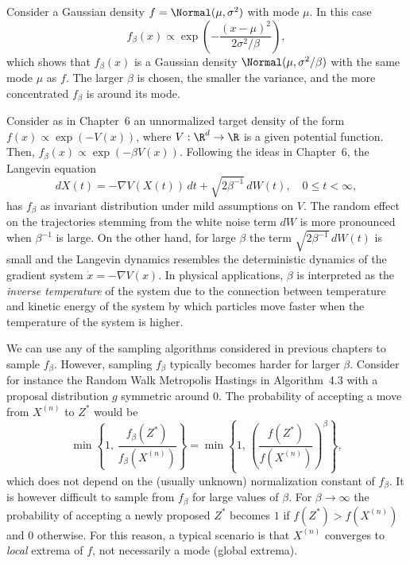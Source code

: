 \begin{example}
\label{ex:7.1}
Consider a Gaussian density $f = \Normal(\mu, \sigma^2)$ with mode $\mu$. In this case
\[
  f_\beta(x) \propto \exp\!\left(-\frac{(x - \mu)^2}{2\sigma^2/\beta}\right),
\]
which shows that $f_\beta(x)$ is a Gaussian density $\Normal(\mu, \sigma^2/\beta)$ with the same
mode $\mu$ as $f$. The larger $\beta$ is chosen, the smaller the variance, and the more
concentrated $f_\beta$ is around its mode.
\end{example}

\begin{example}
\label{ex:7.2}
Consider as in Chapter~6 an unnormalized target density of the form
$f(x) \propto \exp(-V(x))$, where $V : \R^d \to \R$ is a given potential function. Then,
$f_\beta(x) \propto \exp(-\beta V(x))$. Following the ideas in Chapter~6, the Langevin equation
\begin{equation}
  dX(t) = -\nabla V(X(t))\, dt + \sqrt{2\beta^{-1}}\, dW(t), \quad 0 \leq t < \infty,
  \label{eq:7.2}
\end{equation}
has $f_\beta$ as invariant distribution under mild assumptions on $V$. The random effect on
the trajectories stemming from the white noise term $dW$ is more pronounced when $\beta^{-1}$
is large. On the other hand, for large $\beta$ the term $\sqrt{2\beta^{-1}}\, dW(t)$ is small
and the Langevin dynamics resembles the deterministic dynamics of the gradient system
$\dot{x} = -\nabla V(x)$. In physical applications, $\beta$ is interpreted as the
\textit{inverse temperature} of the system due to the connection between temperature and
kinetic energy of the system by which particles move faster when the temperature of the system
is higher.
\end{example}

We can use any of the sampling algorithms considered in previous chapters to sample $f_\beta$.
However, sampling $f_\beta$ typically becomes harder for larger $\beta$. Consider for instance
the Random Walk Metropolis Hastings in Algorithm~4.3 with a proposal distribution $g$ symmetric
around $0$. The probability of accepting a move from $X^{(n)}$ to $Z^*$ would be
\begin{equation}
  \min\!\left\{1,\, \frac{f_\beta(Z^*)}{f_\beta(X^{(n)})}\right\}
  = \min\!\left\{1,\, \left(\frac{f(Z^*)}{f(X^{(n)})}\right)^\beta\right\},
  \label{eq:7.3}
\end{equation}
which does not depend on the (usually unknown) normalization constant of $f_\beta$. It is however
difficult to sample from $f_\beta$ for large values of $\beta$. For $\beta \to \infty$ the
probability of accepting a newly proposed $Z^*$ becomes $1$ if $f(Z^*) > f(X^{(n)})$ and $0$
otherwise. For this reason, a typical scenario is that $X^{(n)}$ converges to \textit{local}
extrema of $f$, not necessarily a mode (global extrema).

